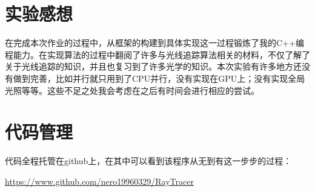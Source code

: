 \section {实验感想}
在完成本次作业的过程中，从框架的构建到具体实现这一过程锻炼了我的C++编程能力。在实现算法的过程中翻阅了许多与光线追踪算法相关的材料，不仅了解了关于光线追踪的知识，并且也复习到了许多光学的知识。本次实验有许多地方还没有做到完善，比如并行就只用到了CPU并行，没有实现在GPU上；没有实现全局光照等等。这些不足之处我会考虑在之后有时间会进行相应的尝试。

\section {代码管理}
代码全程托管在github上，在其中可以看到该程序从无到有这一步步的过程：

\url{https://www.github.com/nero19960329/RayTracer}

